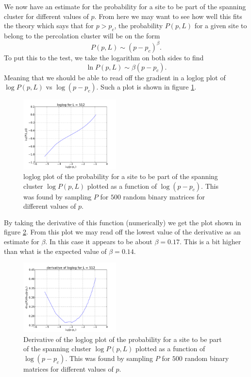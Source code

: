 \documentclass[a4paper,reprint,floatfix,amsmath,amssymb,aps,pra]{revtex4-1}
\begin{document}
We now have an estimate for the probability for a site to be part of the spanning cluster for different values of $p$. From here we may want to see how well this fits the theory which says that for $p > p_{c}$, the probability $P(p,L)$ for a given site to belong to the percolation cluster will be on the form
\begin{equation}
  P(p,L) \sim (p-p_{c})^{\beta}.
\end{equation} 
To put this to the test, we take the logarithm on both sides to find
\begin{equation}
  \ln P(p,L) \sim \beta (p-p_{c}).
\end{equation} 
Meaning that we should be able to read off the gradient in a loglog plot of $\log P(p,L)$ vs $\log(p-p_{c})$. Such a plot is shown in figure \ref{fig:logP-vs-logp}.
\begin{figure}
  \centering
  \includegraphics[width=0.45\textwidth]{../percolation/results/1a/P-vs-p-L512-nsamples500-loglog.pdf}
  \caption{loglog plot of the probability for a site to be part of the spanning cluster $\log P(p,L)$ plotted as a function of $\log (p-p_{c})$. This was found by sampling $P$ for $500$ random binary matrices for different values of $p$.}
  \label{fig:logP-vs-logp}
\end{figure}
By taking the derivative of this function (numerically) we get the plot shown in figure \ref{fig:logP-vs-logp-derivative}. From this plot we may read off the lowest value of the derivative as an estimate for $\beta$. In this case it appears to be about $\beta = 0.17$.
This is a bit higher than what is the expected value of $\beta = 0.14$.
\begin{figure}
  \centering
  \includegraphics[width=0.45\textwidth]{../percolation/results/1a/P-vs-p-L512-nsamples500-loglogderivative.pdf}
  \caption{Derivative of the loglog plot of the probability for a site to be part of the spanning cluster $\log P(p,L)$ plotted as a function of $\log (p-p_{c})$. This was found by sampling $P$ for $500$ random binary matrices for different values of $p$.}
  \label{fig:logP-vs-logp-derivative}
\end{figure}
\end{document}
